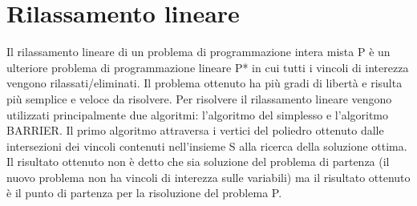 \documentclass[12pt,a4paper,twoside,openright]{book}
\begin{document}
\section{Rilassamento lineare}
Il rilassamento lineare di un problema di programmazione intera mista P è un ulteriore problema di programmazione lineare P* in cui
tutti i vincoli di interezza vengono rilassati/eliminati. Il problema ottenuto ha più gradi di libertà
e risulta più semplice e veloce da risolvere. Per risolvere il rilassamento lineare vengono utilizzati principalmente
due algoritmi: l'algoritmo del simplesso e l'algoritmo BARRIER. Il primo algoritmo attraversa i vertici del poliedro ottenuto dalle intersezioni 
dei vincoli contenuti nell'insieme S alla ricerca della soluzione ottima. Il risultato ottenuto non 
è detto che sia soluzione del problema di partenza (il nuovo problema non ha vincoli di interezza sulle 
variabili) ma il risultato ottenuto è il punto di partenza per la risoluzione del problema P. 
    
\end{document}
